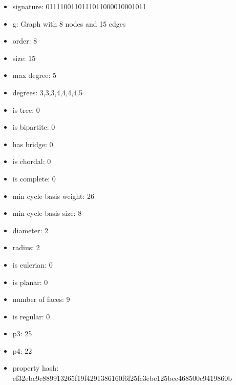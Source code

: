\begin{itemize}
\item signature: 0111100110111011000010001011
\item g: Graph with 8 nodes and 15 edges
\item order: 8
\item size: 15
\item max degree: 5
\item degrees: 3,3,3,4,4,4,4,5
\item is tree: 0
\item is bipartite: 0
\item has bridge: 0
\item is chordal: 0
\item is complete: 0
\item min cycle basis weight: 26
\item min cycle basis size: 8
\item diameter: 2
\item radius: 2
\item is eulerian: 0
\item is planar: 0
\item number of faces: 9
\item is regular: 0
\item p3: 25
\item p4: 22
\item property hash: ef32ebc9c889913265f19f4291386160f6f25fc3ebe125bec468500c9419860b
\end{itemize}
\newpage
\begin{figure}
\end{figure}
